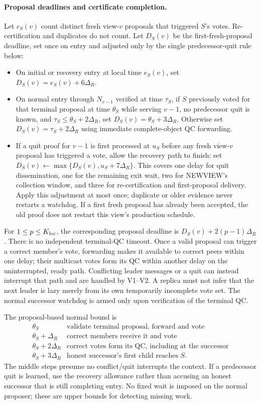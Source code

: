 \documentclass[11pt,a4paper,onecolumn]{article}
\begin{document}
\paragraph{Proposal deadlines and certificate completion.}
\label{sec:local-deadlines}
Let $c_S(v)$ count distinct fresh view-$v$ proposals that triggered $S$'s
votes. Re-certification and duplicates do not count. Let $D_S(v)$ be the
first-fresh-proposal deadline, set once on entry and adjusted only by the
single predecessor-quit rule below:
\begin{itemize}
\item On initial or recovery entry at local time $e_S(v)$, set
$D_S(v)=e_S(v)+6\Delta_R$.
\item On normal entry through $N_{v-1}$ verified at time $\tau_S$, if $S$
previously voted for that terminal proposal at time $\theta_S$ while serving
$v-1$, no predecessor quit is known, and $\tau_S\leq\theta_S+2\Delta_R$,
set $D_S(v)=\theta_S+3\Delta_R$. Otherwise set
$D_S(v)=\tau_S+2\Delta_R$ using immediate complete-object QC forwarding.
\item If a quit proof for $v-1$ is first processed at $u_S$ before any fresh
view-$v$ proposal has triggered a vote, allow the recovery path to finish:
set $D_S(v)\gets\max\{D_S(v),u_S+7\Delta_R\}$. This covers one delay for
quit dissemination, one for the remaining exit wait, two for NEWVIEW's
collection window, and three for re-certification and first-proposal delivery.
Apply this adjustment at most once; duplicate or older evidence never
restarts a watchdog. If a first fresh proposal has already been accepted,
the old proof does not restart this view's production schedule.
\end{itemize}
For $1\leq p\leq K_{\rm loc}$, the corresponding proposal deadline is
$D_S(v)+2(p-1)\Delta_R$. There is no independent terminal-QC timeout.
Once a valid proposal can trigger a correct member's vote, forwarding makes
it available to correct peers within one delay; their multicast votes form
its QC within another delay on the uninterrupted, ready path. Conflicting
leader messages or a quit can instead interrupt that path and are handled
by V1--V2. A replica must not infer that the next leader is lazy merely from
its own temporarily incomplete vote set. The normal successor watchdog is
armed only upon verification of the terminal QC.

The proposal-based normal bound is
\[
 \begin{array}{c|l}
 \theta_S & \text{validate terminal proposal, forward and vote}\\
 \theta_S+\Delta_R & \text{correct members receive it and vote}\\
 \theta_S+2\Delta_R & \text{correct votes form its QC, including at the successor}\\
 \theta_S+3\Delta_R & \text{honest successor's first child reaches }S.
 \end{array}
\]
The middle steps presume no conflict/quit interrupts the context. If a
predecessor quit is learned, use the recovery allowance rather than accusing
an honest successor that is still completing entry. No fixed wait is imposed
on the normal proposer; these are upper bounds for detecting missing work.
\end{document}
